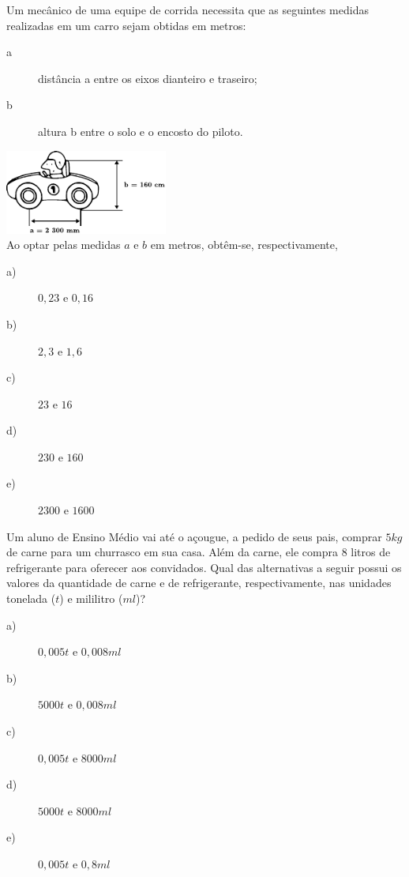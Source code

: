 \newpage

\begin{exercise}[ENEM 2011]
Um mecânico de uma equipe de corrida necessita que as seguintes medidas realizadas em um carro sejam obtidas em metros:\\

\begin{description}
    \item[a] distância a entre os eixos dianteiro e traseiro;
    \item[b] altura b entre o solo e o encosto do piloto. 
\end{description}
\includegraphics[width=0.4\textwidth]{imagens/matematicaBasica/sistemaDeUnidades/carro.pdf}\\
Ao optar pelas medidas $a$ e $b$ em metros, obtêm-se, respectivamente,

    \begin{description}
        \item[a)] $0,23 \textrm{ e } 0,16$
        \item[b)] $2,3 \textrm{ e } 1,6$
        \item[c)] $23 \textrm{ e } 16$
        \item[d)] $230 \textrm{ e } 160$
        \item[e)] $2300 \textrm{ e } 1600$
    \end{description}

\end{exercise}

\begin{exercise}[ENEM 2011]
Um aluno de Ensino Médio vai até o açougue, a pedido de seus pais, comprar $5 kg$ de carne para um churrasco em sua casa. Além da carne, ele compra $8$ litros de refrigerante para oferecer aos convidados. Qual das alternativas a seguir possui os valores da quantidade de carne e de refrigerante, respectivamente, nas unidades tonelada ($t$) e mililitro ($ml$)?

    \begin{description}
        \item[a)] $0,005 t \textrm{ e } 0,008 ml$
        \item[b)] $5000 t \textrm{ e } 0,008 ml$
        \item[c)] $0,005 t \textrm{ e } 8000 ml$
        \item[d)] $5000 t \textrm{ e } 8000 ml$
        \item[e)] $0,005 t \textrm{ e } 0,8 ml$
    \end{description}

\end{exercise}
